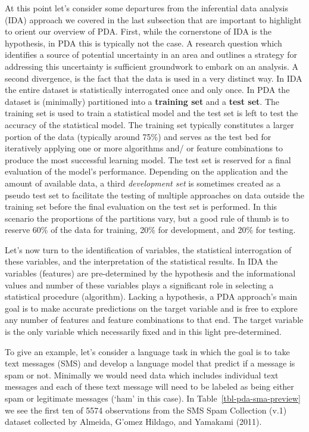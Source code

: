 \documentclass[
  letterpaper,
]{latex/krantz}
\begin{document}
At this point let's consider some departures from the inferential data
analysis (IDA) approach we covered in the last subsection that are
important to highlight to orient our overview of PDA. First, while the
cornerstone of IDA is the hypothesis, in PDA this is typically not the
case. A research question which identifies a source of potential
uncertainty in an area and outlines a strategy for addressing this
uncertainty is sufficient groundwork to embark on an analysis. A second
divergence, is the fact that the data is used in a very distinct way. In
IDA the entire dataset is statistically interrogated once and only once.
In PDA the dataset is (minimally) partitioned into a \textbf{training
set} and a \textbf{test set}. The training set is used to train a
statistical model and the test set is left to test the accuracy of the
statistical model. The training set typically constitutes a larger
portion of the data (typically around 75\%) and serves as the test bed
for iteratively applying one or more algorithms and/ or feature
combinations to produce the most successful learning model. The test set
is reserved for a final evaluation of the model's performance. Depending
on the application and the amount of available data, a third
\emph{development set} is sometimes created as a pseudo test set to
facilitate the testing of multiple approaches on data outside the
training set before the final evaluation on the test set is performed.
In this scenario the proportions of the partitions vary, but a good rule
of thumb is to reserve 60\% of the data for training, 20\% for
development, and 20\% for testing.

Let's now turn to the identification of variables, the statistical
interrogation of these variables, and the interpretation of the
statistical results. In IDA the variables (features) are pre-determined
by the hypothesis and the informational values and number of these
variables plays a significant role in selecting a statistical procedure
(algorithm). Lacking a hypothesis, a PDA approach's main goal is to make
accurate predictions on the target variable and is free to explore any
number of features and feature combinations to that end. The target
variable is the only variable which necessarily fixed and in this light
pre-determined.

To give an example, let's consider a language task in which the goal is
to take text messages (SMS) and develop a language model that predict if
a message is spam or not. Minimally we would need data which includes
individual text messages and each of these text message will need to be
labeled as being either spam or legitimate messages (`ham' in this
case). In Table~\ref{tbl-pda-sma-preview} we see the first ten of 5574
observations from the SMS Spam Collection (v.1) dataset collected by
Almeida, G'omez Hildago, and Yamakami (2011).
\end{document}
